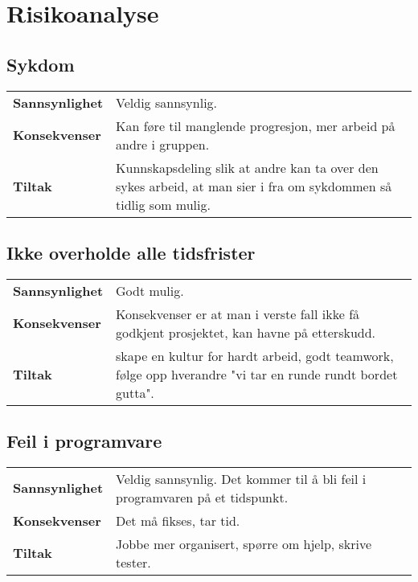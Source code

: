 
\section{Risikoanalyse}
\subsection*{Sykdom}
\begin{tabularx}{\linewidth}{l X}
\textbf{Sannsynlighet} & Veldig sannsynlig.\\
\textbf{Konsekvenser} & Kan føre til manglende progresjon, mer arbeid på andre i gruppen.\\
\textbf{Tiltak} & Kunnskapsdeling slik at andre kan ta over den sykes arbeid, at man sier i fra om sykdommen så tidlig som mulig.\\
\end{tabularx}

\subsection*{Ikke overholde alle tidsfrister}
\begin{tabularx}{\linewidth}{l X}
\textbf{Sannsynlighet} & Godt mulig.\\
\textbf{Konsekvenser} & Konsekvenser er at man i verste fall ikke få godkjent prosjektet, kan havne på etterskudd.\\
\textbf{Tiltak} & skape en kultur for hardt arbeid, godt teamwork, følge opp hverandre "vi tar en runde rundt bordet gutta".\\
\end{tabularx}

\subsection*{Feil i programvare}
\begin{tabularx}{\linewidth}{l X}
\textbf{Sannsynlighet} & Veldig sannsynlig. Det kommer til å bli feil i programvaren på et tidspunkt.\\
\textbf{Konsekvenser} & Det må fikses, tar tid.\\
\textbf{Tiltak} & Jobbe mer organisert, spørre om hjelp, skrive tester.\\
\end{tabularx}

